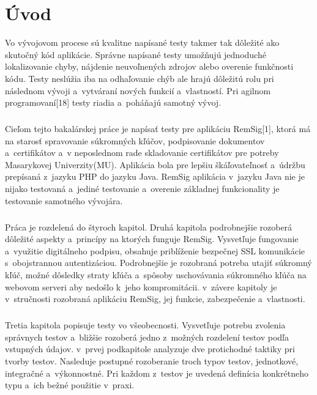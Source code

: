 \documentclass[
  printed, %
  notable,   %
  nolof,     %
    oneside,       %
  nolot,     %
]{fithesis3}
\begin{document}
\chapter{Úvod}
Vo vývojovom procese sú kvalitne napísané testy takmer tak dôležité ako skutočný kód aplikácie. Správne napísané testy umožňujú jednoduché lokalizovanie chyby, nájdenie neuvoľnených zdrojov alebo overenie funkčnosti kódu. Testy neslúžia iba na odhaľovanie chýb ale hrajú dôležitú rolu pri následnom vývoji a~vytváraní nových funkcií a~vlastností. Pri agilnom programovaní[18] testy riadia a~poháňajú samotný vývoj. \paragraph{}
Cieľom tejto bakalárskej práce je napísať testy pre aplikáciu RemSig[1], ktorá má na starosť spravovanie súkromných kľúčov, podpisovanie dokumentov a~certifikátov a~v neposlednom rade skladovanie certifikátov pre potreby Masarykovej Univerzity(MU). Aplikácia bola pre lepšiu škáľovateľnosť a~údržbu prepísaná z~jazyku PHP do jazyku Java. RemSig aplikácia v~jazyku Java nie je nijako testovaná a~jediné testovanie a~overenie základnej funkcionality je testovanie samotného vývojára.\paragraph{}
Práca je rozdelená do štyroch kapitol. Druhá kapitola podrobnejšie rozoberá dôležité aspekty a~princípy na ktorých funguje RemSig. Vysvetľuje fungovanie a~využitie digitálneho podpisu, obsahuje priblíženie bezpečnej SSL komunikácie s~obojstrannou autentizáciou. Podrobnejšie je rozobraná potreba utajiť súkromný kľúč, možné dôsledky straty kľúča a~spôsoby uschovávania súkromného kľúča na webovom serveri aby nedošlo k~jeho kompromitácii. v~závere kapitoly  je v~stručnosti rozobraná aplikáciu RemSig, jej funkcie, zabezpečenie a~vlastnosti. \paragraph{}
Tretia kapitola popisuje testy vo všeobecnosti. Vysvetľuje potrebu zvolenia správnych testov a~bližšie rozoberá jedno z~možných rozdelení testov podľa vstupných údajov. v~prvej podkapitole analyzuje dve protichodné taktiky pri tvorby testov. Nasleduje postupné rozoberanie troch typov testov, jednotkové, integračné a~výkonnostné. Pri každom z~testov je uvedená definícia konkrétneho typu a~ich bežné použitie v~praxi.\paragraph{}
\end{document}
